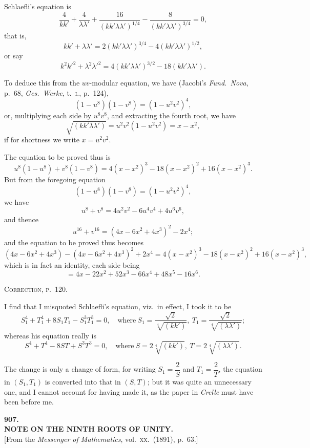 \documentclass[11pt,a4paper]{article}
\begin{document}
Schlaefli's equation is
\[
\frac{4}{k k'} + \frac{4}{\lambda \lambda'} + \frac{16}{(k k' \lambda \lambda')^{1/4}} - \frac{8}{(k k' \lambda \lambda')^{3/4}} = 0,
\]
that is,
\[
k k' + \lambda \lambda' = 2 (k k' \lambda \lambda')^{3/4} - 4 (k k' \lambda \lambda')^{1/2},
\]
or say
\[
k^2 k'^2 + \lambda^2 \lambda'^2 = 4 (k k' \lambda \lambda')^{3/2} - 18 (k k' \lambda \lambda').
\]

To deduce this from the $uv$-modular equation, we have (Jacobi's \emph{Fund.\ Nova}, p.\ 68, \emph{Ges.\ Werke}, t.\ \textsc{i}., p.\ 124),
\[
(1 - u^8)(1 - v^8) = (1 - u^2 v^2)^4,
\]
or, multiplying each side by $u^8 v^8$, and extracting the fourth root, we have
\[
\sqrt{(k k' \lambda \lambda')} = u^2 v^2 (1 - u^2 v^2) = x - x^2,
\]
if for shortness we write $x = u^2 v^2$.

The equation to be proved thus is
\[
u^8 (1 - u^8) + v^8 (1 - v^8) = 4 (x - x^2)^3 - 18 (x - x^2)^2 + 16 (x - x^2)^3.
\]
But from the foregoing equation
\[
(1 - u^8)(1 - v^8) = (1 - u^2 v^2)^4,
\]
we have
\[
u^8 + v^8 = 4 u^2 v^2 - 6 u^4 v^4 + 4 u^6 v^6,
\]
and thence
\[
u^{16} + v^{16} = (4 x - 6 x^2 + 4 x^3)^2 - 2 x^4;
\]
and the equation to be proved thus becomes
\[
(4 x - 6 x^2 + 4 x^3) - (4 x - 6 x^2 + 4 x^3)^2 + 2 x^4 = 4 (x - x^2)^3 - 18 (x - x^2)^2 + 16 (x - x^2)^3,
\]
which is in fact an identity, each side being
\[
= 4 x - 22 x^2 + 52 x^3 - 66 x^4 + 48 x^5 - 16 x^6.
\]

\bigskip
\begin{center}
\textsc{Correction, p.\ 120.}
\end{center}

I find that I misquoted Schlaefli's equation, viz.\ in effect, I took it to be
\[
S_1^4 + T_1^4 + 8 S_1 T_1 - S_1^3 T_1^3 = 0,\quad \text{where}\ S_1 = \frac{\sqrt{2}}{\sqrt[4]{(k k')}},\ T_1 = \frac{\sqrt{2}}{\sqrt[4]{(\lambda \lambda')}};
\]
whereas his equation really is
\[
S^4 + T^4 - 8 S T + S^3 T^3 = 0,\quad \text{where}\ S = 2 \sqrt[4]{(k k')},\ T = 2 \sqrt[4]{(\lambda \lambda')}.
\]

The change is only a change of form, for writing $S_1 = \dfrac{2}{S}$ and $T_1 = \dfrac{2}{T}$, the equation in $(S_1, T_1)$ is converted into that in $(S, T)$; but it was quite an unnecessary one, and I cannot account for having made it, as the paper in \emph{Crelle} must have been before me.

\clearpage

\begin{center}
{\large\bfseries 907.}\\[0.5em]
{\large\bfseries NOTE ON THE NINTH ROOTS OF UNITY.}\\[0.5em]
\small [From the \emph{Messenger of Mathematics}, vol.\ \textsc{xx}.\ (1891), p.\ 63.]
\end{center}
\medskip
\end{document}
